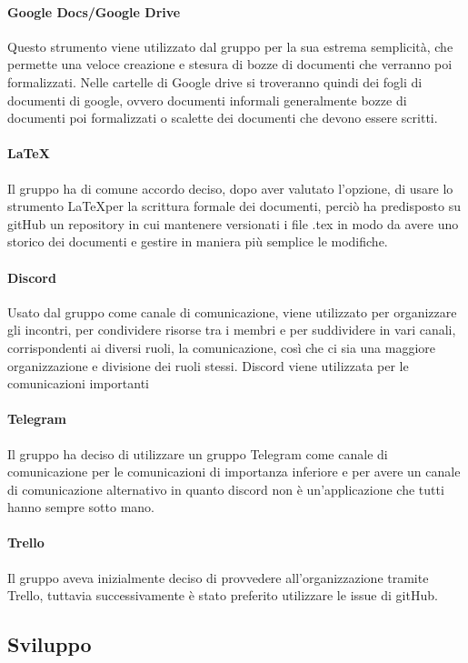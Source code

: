 \documentclass[../norme_di_progetto.tex]{subfiles}
\begin{document}
\paragraph{Google Docs/Google Drive}
Questo strumento viene utilizzato dal gruppo per la sua estrema semplicità, che permette una veloce creazione e stesura di bozze di documenti che verranno poi formalizzati. Nelle cartelle di Google drive si troveranno quindi dei fogli di documenti di google, ovvero documenti informali generalmente bozze di documenti poi formalizzati o scalette dei documenti che devono essere scritti.

\paragraph{\LaTeX}
Il gruppo ha di comune accordo deciso, dopo aver valutato l'opzione, di usare lo strumento \LaTeX per la scrittura formale dei documenti, perciò ha predisposto su gitHub un repository in cui mantenere versionati i file .tex in modo da avere uno storico dei documenti e gestire in maniera più semplice le modifiche.

\paragraph{Discord}
Usato dal gruppo come canale di comunicazione, viene utilizzato per organizzare gli incontri, per condividere risorse tra i membri e per suddividere in vari canali, corrispondenti ai diversi ruoli, la comunicazione, così che ci sia una maggiore organizzazione e divisione dei ruoli stessi. Discord viene utilizzata per le comunicazioni importanti

\paragraph{Telegram}
Il gruppo ha deciso di utilizzare un gruppo Telegram come canale di comunicazione per le comunicazioni di importanza inferiore e per avere un canale di comunicazione alternativo in quanto discord non è un'applicazione che tutti hanno sempre sotto mano.

\paragraph{Trello}
Il gruppo aveva inizialmente deciso di provvedere all'organizzazione tramite Trello, tuttavia successivamente è stato preferito utilizzare le issue di gitHub.

\subsection{Sviluppo}
\end{document}
